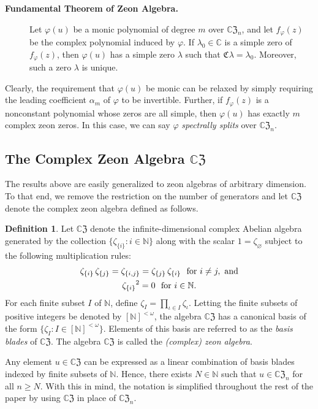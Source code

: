 \documentclass{article}
\theoremstyle{definition}
\newtheorem{definition}[theorem]{Definition}
\newcommand{\zco}{\mathfrak{C}\mspace{1mu}}
\newcommand{\CZ}{\mathbb{C}\mathfrak{Z}}
\numberwithin{equation}{section}
\begin{document}
\begin{description}
\item [{\bf Fundamental Theorem of Zeon Algebra.}]
Let $\varphi(u)$ be a monic polynomial of degree $m$ over $\CZ_n$, and let $f_\varphi(z)$ be the complex polynomial induced by $\varphi$.  If $\lambda_0\in\mathbb{C}$ is a simple zero of $f_\varphi(z)$, then $\varphi(u)$ has a simple zero $\lambda$ such that $\zco\lambda = \lambda_0$. Moreover, such a zero $\lambda$ is unique.
\end{description}
Clearly, the requirement that $\varphi(u)$ be monic can be relaxed by simply requiring the leading coefficient $\alpha_m$ of $\varphi$ to be invertible.  Further, if $f_\varphi(z)$ is a nonconstant polynomial whose zeros are all simple, then $\varphi(u)$ has exactly $m$ complex zeon zeros.  In this case, we can say $\varphi$ {\em spectrally splits} over $\CZ_n$.

\subsection{The Complex Zeon Algebra $\CZ$}

The results above are easily generalized to zeon algebras of arbitrary dimension.  To that end, we remove the restriction on the number of generators and let $\CZ$ denote the complex zeon algebra defined as follows.

\begin{definition}
Let $\CZ$ denote the infinite-dimensional complex Abelian algebra generated by the collection $\{\zeta_{\{i\}}: i\in \mathbb{N}\}$ along with the scalar $1=\zeta_\varnothing$ subject to the following multiplication rules:
\begin{gather*}
\zeta_{\{i\}}\,\zeta_{\{j\}}=\zeta_{\{i,j\}}=\zeta_{\{j\}}\,\zeta_{\{i\}}\,\,\text{ \rm
for }i\ne j,\text{ \rm and}\\
{\zeta_{\{i\}}}^2=0\,\,\text{ \rm for }i\in \mathbb{N}.
\end{gather*}
For each finite subset $I$ of $\mathbb{N}$, define $\displaystyle\zeta_{I}=\prod_{\iota\in I}\zeta_\iota$.  Letting the finite subsets of positive integers be denoted by $[\mathbb{N}]^{<\omega}$, the algebra $\CZ$ has a canonical basis of the form $\{\zeta_I: I\in [\mathbb{N}]^{<\omega}\}$.   Elements of this basis are referred to as the {\em basis blades} of $\CZ$.   The algebra $\CZ$ is called the  {\em (complex) zeon algebra}.
\end{definition}

Any element $u\in\CZ$ can be expressed as a linear combination of basis blades indexed by finite subsets of $\mathbb{N}$.  Hence, there exists $N\in\mathbb{N}$ such that $u\in \CZ_n$ for all $n\ge N$.   With this in mind, the notation is simplified throughout the rest of the paper by using $\CZ$ in place of $\CZ_n$.
\end{document}
